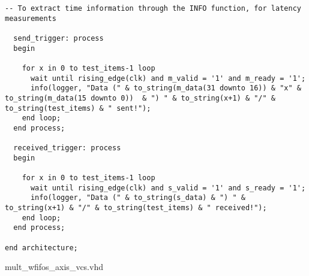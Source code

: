 \begin{code}
\begin{verbatim}
-- To extract time information through the INFO function, for latency measurements

  send_trigger: process
  begin

    for x in 0 to test_items-1 loop
      wait until rising_edge(clk) and m_valid = '1' and m_ready = '1';
      info(logger, "Data (" & to_string(m_data(31 downto 16)) & "x" & to_string(m_data(15 downto 0))  & ") " & to_string(x+1) & "/" & to_string(test_items) & " sent!");
    end loop;
  end process;

  received_trigger: process
  begin

    for x in 0 to test_items-1 loop
      wait until rising_edge(clk) and s_valid = '1' and s_ready = '1';
      info(logger, "Data (" & to_string(s_data) & ") " & to_string(x+1) & "/" & to_string(test_items) & " received!");
    end loop;
  end process;

end architecture;
\end{verbatim}
\caption{mult\_wfifos\_axis\_vcs.vhd}
\label{ap-cod:20}
\end{code}


